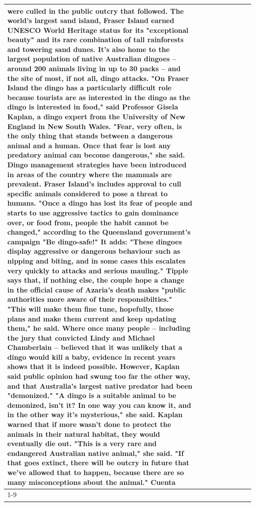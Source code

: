 \begin{table}[H]
\begin{tabular}{lllrlllll}
were culled in the public outcry that followed. The world's largest sand island, Fraser Island earned UNESCO World Heritage status for its "exceptional beauty" and its rare combination of tall rainforests and towering sand dunes. It's also home to the largest population of native Australian dingoes -- around 200 animals living in up to 30 packs -- and the site of most, if not all, dingo attacks. "On Fraser Island the dingo has a particularly difficult role because tourists are as interested in the dingo as the dingo is interested in food," said Professor Gisela Kaplan, a dingo expert from the University of New England in New South Wales. "Fear, very often, is the only thing that stands between a dangerous animal and a human. Once that fear is lost any predatory animal can become dangerous," she said. Dingo management strategies have been introduced in areas of the country where the mammals are prevalent. Fraser Island's includes approval to cull specific animals considered to pose a threat to humans. "Once a dingo has lost its fear of people and starts to use aggressive tactics to gain dominance over, or food from, people the habit cannot be changed," according to the Queensland government's campaign "Be dingo-safe!" It adds: "These dingoes display aggressive or dangerous behaviour such as nipping and biting, and in some cases this escalates very quickly to attacks and serious mauling." Tipple says that, if nothing else, the couple hope a change in the official cause of Azaria's death makes "public authorities more aware of their responsibilties." "This will make them fine tune, hopefully, those plans and make them current and keep updating them," he said. Where once many people -- including the jury that convicted Lindy and Michael Chamberlain -- believed that it was unlikely that a dingo would kill a baby, evidence in recent years shows that it is indeed possible. However, Kaplan said public opinion had swung too far the other way, and that Australia's largest native predator had been "demonized." "A dingo is a suitable animal to be demonized, isn't it? In one way you can know it, and in the other way it's mysterious," she said. Kaplan warned that if more wasn't done to protect the animals in their natural habitat, they would eventually die out. "This is a very rare and endangered Australian native animal," she said. "If that goes extinct, there will be outcry in future that we've allowed that to happen, because there are so many misconceptions about the animal." Cuenta \\
\cline{1-9}

\end{tabular}
\end{table}
